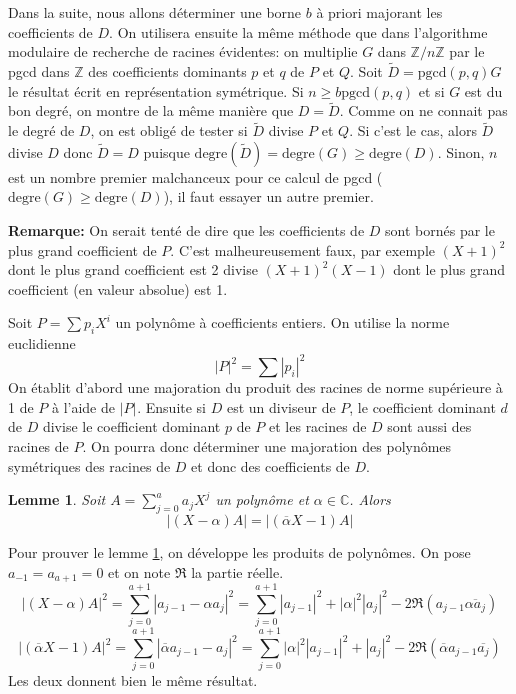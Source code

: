 \documentclass[a4paper,11pt]{article}
\newtheorem{lemma}[thm]{Lemme}
\begin{document}
\begin{giacjshere}
Dans la suite, nous allons déterminer une borne $b$ à priori majorant 
les coefficients de
$D$. On utilisera ensuite la même méthode que dans l'algorithme modulaire de
recherche de racines évidentes: on multiplie $G$ dans $\mathbb{Z} / n
\mathbb{Z}$ par le pgcd dans $\mathbb{Z}$ des coefficients dominants $p$ et
$q$ de $P$ et $Q$. Soit $\tilde{D} = \mbox{pgcd} ( p, q ) G$ le résultat écrit
en représentation symétrique. Si $n \geqslant b \mbox{pgcd} ( p, q )$ et si
$G$ est du bon degré, on montre de la même manière que $D = \tilde{D}$. Comme 
on ne connait pas le degré de $D$, on est obligé de tester si $\tilde{D}$ 
divise $P$
et $Q$. Si c'est le cas, alors $\tilde{D}$ divise $D$ donc $\tilde{D} = D$
puisque $\mbox{degre} ( \tilde{D} ) = \mbox{degre} ( G ) \geqslant
\mbox{degre} ( D )$. Sinon, $n$ est un nombre premier malchanceux pour ce
calcul de pgcd ($\mbox{degre} ( G ) \geqslant \mbox{degre} ( D )$), il faut
essayer un autre premier.

{\bf{Remarque:}} On serait tenté de dire que les coefficients de $D$
sont bornés par le plus grand coefficient de $P$. C'est malheureusement faux,
par exemple $( X + 1 )^2$ dont le plus grand coefficient est 2 divise $( X + 1
)^2 ( X - 1 )$ dont le plus grand coefficient (en valeur absolue) est 1.

Soit $P = \sum p_i X^i$ un polynôme à coefficients entiers. On utilise la
norme euclidienne
\begin{equation}
  | P |^2 = \sum | p_i |^2
\end{equation}
On établit d'abord une majoration du produit des racines de norme supérieure à
1 de $P$ à l'aide de $| P |^{}$. Ensuite si $D$ est un diviseur de $P$, le
coefficient dominant $d$ de $D$ divise le coefficient dominant $p$ de $P$ et 
les racines de $D$ sont aussi des racines de $P$. On pourra donc déterminer une
majoration des polynômes symétriques des racines de $D$ et donc des
coefficients de $D$.

\begin{lemma} \label{lemme:A}
  Soit $A = \sum_{j = 0}^a a_j X^j$ un polynôme et $\alpha \in \mathbb{C}$.
  Alors
  \[ \text{$| ( X - \alpha ) A | = | ( \overline{\alpha} X - 1 ) A |$} \]
\end{lemma}

Pour prouver le lemme \ref{lemme:A}, on développe les produits de polynômes. 
On pose $a_{-1} = a_{a + 1} = 0$ et on note $\Re$ la partie réelle.
\[ \text{$| ( X - \alpha ) A |^2 = \sum_{j = 0}^{a + 1}$} | a_{j - 1} - \alpha
   a_j |^2 = \sum_{j = 0}^{a + 1} | a_{j - 1} |^2 + | \alpha |^2 | a_j |^2 - 2
   \Re ( a_{j - 1} \overline{\alpha  a_j} ) \]
\[ \text{$| (  \overline{\alpha} X - 1 ) A |$}^2 = \sum_{j = 0}^{a + 1} | 
\overline{\alpha} a_{j - 1}
   - a_j |^2 = \sum_{j = 0}^{a + 1} | \alpha |^2 | a_{j - 1} |^2 + | a_j |^2 -
   2 \Re ( \overline{\alpha}  a_{j - 1}   \overline{a_j} ) \]
Les deux donnent bien le même résultat.


\end{giacjshere}
\end{document}
